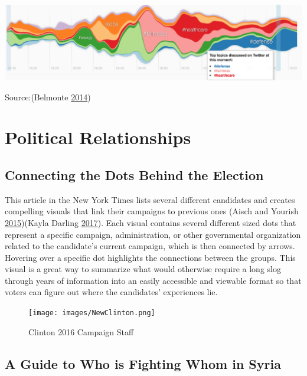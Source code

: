 \documentclass[]{book}
\begin{document}
\includegraphics{images/SotU2014.png}

Source:(Belmonte \protect\hyperlink{ref-SotU2014}{2014})

\hypertarget{political-relationships}{%
\section{Political Relationships}\label{political-relationships}}

\hypertarget{connecting-the-dots-behind-the-election}{%
\subsection{Connecting the Dots Behind the Election}\label{connecting-the-dots-behind-the-election}}

This article in the New York Times lists several different candidates and creates compelling visuals that link their campaigns to previous ones (Aisch and Yourish \protect\hyperlink{ref-campaign_staff}{2015})(Kayla Darling \protect\hyperlink{ref-cool_data}{2017}). Each visual contains several different sized dots that represent a specific campaign, administration, or other governmental organization related to the candidate's current campaign, which is then connected by arrows. Hovering over a specific dot highlights the connections between the groups. This visual is a great way to summarize what would otherwise require a long slog through years of information into an easily accessible and viewable format so that voters can figure out where the candidates' experiences lie.

\begin{figure}
\centering
\texttt{[image: images/NewClinton.png]}
\caption{Clinton 2016 Campaign Staff}
\end{figure}

\hypertarget{a-guide-to-who-is-fighting-whom-in-syria}{%
\subsection{A Guide to Who is Fighting Whom in Syria}\label{a-guide-to-who-is-fighting-whom-in-syria}}
\end{document}
